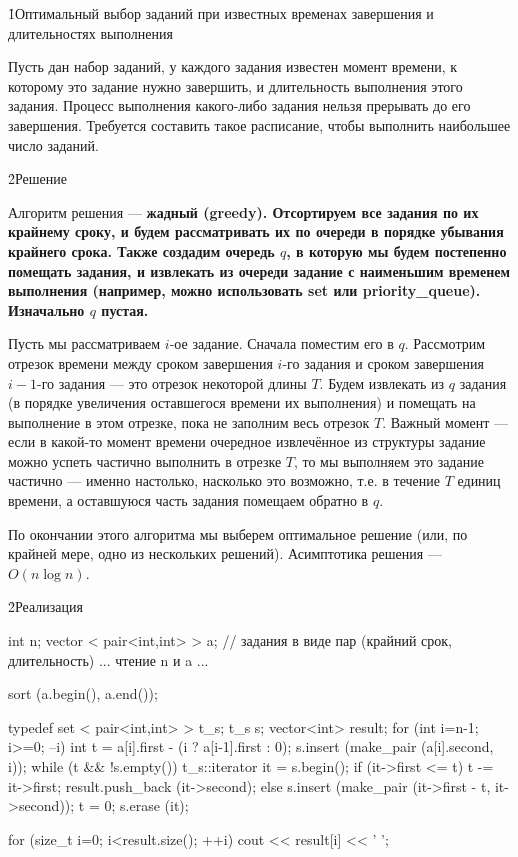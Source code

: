 \h1{Оптимальный выбор заданий при известных временах завершения и длительностях выполнения}

Пусть дан набор заданий, у каждого задания известен момент времени, к которому это задание нужно завершить, и длительность выполнения этого задания. Процесс выполнения какого-либо задания нельзя прерывать до его завершения. Требуется составить такое расписание, чтобы выполнить наибольшее число заданий.

\h2{Решение}

Алгоритм решения --- \bf{жадный} (greedy). Отсортируем все задания по их крайнему сроку, и будем рассматривать их по очереди в порядке убывания крайнего срока. Также создадим очередь $q$, в которую мы будем постепенно помещать задания, и извлекать из очереди задание с наименьшим временем выполнения (например, можно использовать set или priority_queue). Изначально $q$ пустая.

Пусть мы рассматриваем $i$-ое задание. Сначала поместим его в $q$. Рассмотрим отрезок времени между сроком завершения $i$-го задания и сроком завершения $i-1$-го задания --- это отрезок некоторой длины $T$. Будем извлекать из $q$ задания (в порядке увеличения оставшегося времени их выполнения) и помещать на выполнение в этом отрезке, пока не заполним весь отрезок $T$. Важный момент --- если в какой-то момент времени очередное извлечённое из структуры задание можно успеть частично выполнить в отрезке $T$, то мы выполняем это задание частично --- именно настолько, насколько это возможно, т.е. в течение $T$ единиц времени, а оставшуюся часть задания помещаем обратно в $q$.

По окончании этого алгоритма мы выберем оптимальное решение (или, по крайней мере, одно из нескольких решений). Асимптотика решения --- $O (n \log n)$.


\h2{Реализация}


\code
int n;
vector < pair<int,int> > a; // задания в виде пар (крайний срок, длительность)
... чтение n и a ...

sort (a.begin(), a.end());

typedef set < pair<int,int> > t_s;
t_s s;
vector<int> result;
for (int i=n-1; i>=0; --i) {
	int t = a[i].first - (i ? a[i-1].first : 0);
	s.insert (make_pair (a[i].second, i));
	while (t && !s.empty()) {
		t_s::iterator it = s.begin();
		if (it->first <= t) {
			t -= it->first;
			result.push_back (it->second);
		}
		else {
			s.insert (make_pair (it->first - t, it->second));
			t = 0;
		}
		s.erase (it);
	}
}

for (size_t i=0; i<result.size(); ++i)
	cout << result[i] << ' ';
\endcode